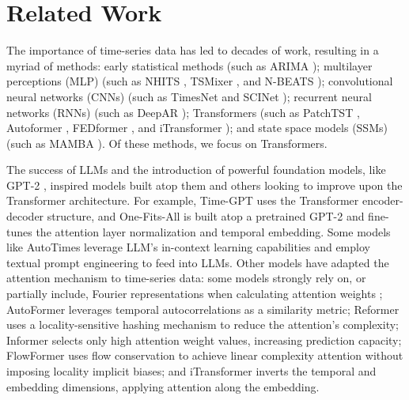 \section{Related Work}
The importance of time-series data has led to decades of work, resulting in a myriad of methods: early statistical methods \cite{holt1957forecasting,hyndman2018forecasting,taylor.forecasting.2018,winters.TS_forecasting.1960} (such as ARIMA \cite{box.TSA_forecasting.1970}); multilayer perceptions (MLP) \cite{Chen.mlp_vs_transformer.2023, li2023revisitinglongtermtimeseries,das2023longterm, zhang2022morefastmultivariatetime} (such as NHITS \cite{challu.NHITS.2023}, TSMixer \cite{chen2023tsmixer}, and N-BEATS \cite{oreshkin2020N-BEATS}); convolutional neural networks (CNNs) \cite{He_2019, franceschi.unsupervised.2019, bai2018empirical} (such as TimesNet \cite{wu2023timesnet} and SCINet \cite{liu2022scinet}); recurrent neural networks (RNNs) \cite{shen.timeseries.2020, hochreiter.LSTM_TS.1997} (such as DeepAR \cite{SALINAS20201181}); Transformers \cite{zhou2023OFA, garza2024timegpt1, woo2022etsformerexponentialsmoothingtransformers, zhou.fedformer.2022, liu.nonstationary.2022, wu.flowformer.2022, xu2022anomaly, liu2022pyraformer, Zhou.informer.2021, Kitaev2020Reformer, li.enhancing_locality.2019, talukder2024totem, eisenach2022mqtransformermultihorizonforecastscontext} (such as PatchTST \cite{nie.patchtst.2023a}, Autoformer \cite{wu2021autoformer}, FEDformer \cite{zhou.fedformer.2022}, and iTransformer \cite{liu2024itransformer}); and state space models (SSMs) \cite{ahamed2024tscmambamambameetsmultiview, Wang2024IsME, zhang2023effectively} (such as MAMBA \cite{gu2024mambalineartimesequencemodeling}).
Of these methods, we focus on Transformers.

The success of LLMs and the introduction of powerful foundation models, like GPT-2 \cite{radford2019language}, inspired models built atop them and others looking to improve upon the Transformer architecture.
For example, Time-GPT \cite{garza2024timegpt1} uses the Transformer encoder-decoder structure, and One-Fits-All \cite{zhou2023OFA} is built atop a pretrained GPT-2 and fine-tunes the attention layer normalization and temporal embedding.
Some models like AutoTimes \cite{liu2024autotimesautoregressivetimeseries} leverage LLM's in-context learning capabilities and employ textual prompt engineering to feed into LLMs.
Other models have adapted the attention mechanism to time-series data: some models strongly rely on, or partially include, Fourier representations when calculating attention weights \cite{zhou.fedformer.2022, woo2022etsformerexponentialsmoothingtransformers}; AutoFormer \cite{wu2021autoformer} leverages temporal autocorrelations as a similarity metric; Reformer \cite{Kitaev2020Reformer} uses a locality-sensitive hashing mechanism to reduce the attention's complexity; Informer \cite{Zhou.informer.2021} selects only high attention weight values, increasing prediction capacity; FlowFormer \cite{wu.flowformer.2022} uses flow conservation to achieve linear complexity attention without imposing locality implicit biases; and iTransformer \cite{liu2024itransformer} inverts the temporal and embedding dimensions, applying attention along the embedding.  

